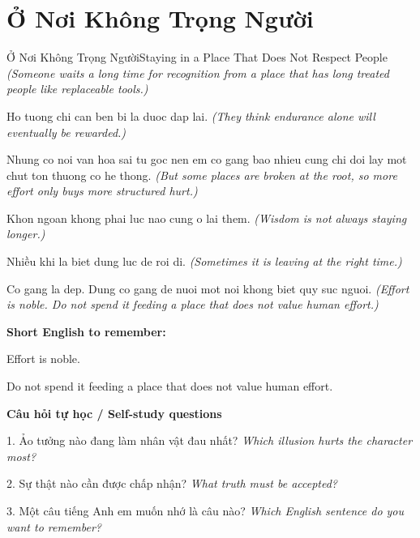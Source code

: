 \section{Ở Nơi Không Trọng Người}
\begin{truyen}{Ở Nơi Không Trọng Người}{Staying in a Place That Does Not Respect People}
\textit{(Someone waits a long time for recognition from a place that has long treated people like replaceable tools.)}

Ho tuong chi can ben bi la duoc dap lai.
\textit{(They think endurance alone will eventually be rewarded.)}

Nhung co noi van hoa sai tu goc nen em co gang bao nhieu cung chi doi lay mot chut ton thuong co he thong.
\textit{(But some places are broken at the root, so more effort only buys more structured hurt.)}

Khon ngoan khong phai luc nao cung o lai them.
\textit{(Wisdom is not always staying longer.)}

Nhiều khi la biet dung luc de roi di.
\textit{(Sometimes it is leaving at the right time.)}

\end{truyen}

\begin{baihoc}
Co gang la dep. Dung co gang de nuoi mot noi khong biet quy suc nguoi.
\textit{(Effort is noble. Do not spend it feeding a place that does not value human effort.)}
\end{baihoc}

\begin{ghinhoanh}
\textbf{Short English to remember:}

Effort is noble.

Do not spend it feeding a place that does not value human effort.

\end{ghinhoanh}

\begin{tuhocnhanh}
\textbf{Câu hỏi tự học / Self-study questions}

1. Ảo tưởng nào đang làm nhân vật đau nhất? \textit{Which illusion hurts the character most?}

2. Sự thật nào cần được chấp nhận? \textit{What truth must be accepted?}

3. Một câu tiếng Anh em muốn nhớ là câu nào? \textit{Which English sentence do you want to remember?}
\end{tuhocnhanh}
\ngancach

